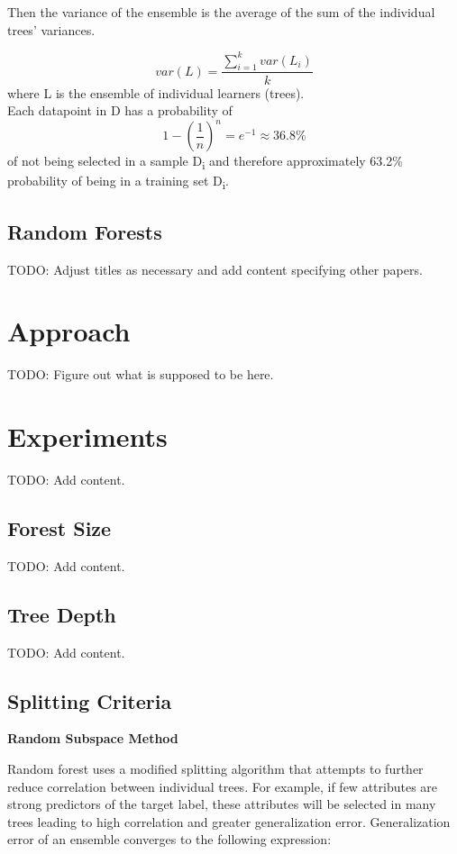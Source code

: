 \documentclass{article} %
\begin{document}
Then the variance of the ensemble is the average of the sum of the individual trees' variances.

\[ var(L) = \frac{\sum_{i=1}^k var(L_i)}{k}\] where L is the ensemble of individual learners (trees).\\

Each datapoint in D has a probability of \[1-\left(\frac{1}{n}\right)^n = e^{-1} \approx 36.8 \% \] of not being selected in  a sample D\textsubscript{i} and therefore approximately 63.2\% probability of being in a training set D\textsubscript{i}.

\subsection{Random Forests}
TODO: Adjust titles as necessary and add content specifying other papers.

\section{Approach}
TODO: Figure out what is supposed to be here.

\section{Experiments}
TODO: Add content.

\subsection{Forest Size}
TODO: Add content.

\subsection{Tree Depth}
TODO: Add content.

\subsection{Splitting Criteria}

\textbf{Random Subspace Method}

Random forest uses a modified splitting algorithm that attempts to further reduce correlation between individual trees. For example, if few attributes are strong predictors of the target label, these attributes will be selected in many trees leading to high correlation and greater generalization error.  Generalization error of an ensemble converges to the following expression:
\end{document}
